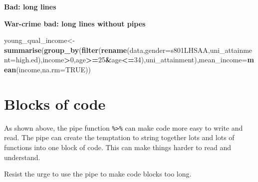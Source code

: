 \documentclass[]{book}
\newenvironment{Shaded}{\begin{snugshade}}{\end{snugshade}}
\newcommand{\DataTypeTok}[1]{\textcolor[rgb]{0.13,0.29,0.53}{#1}}
\newcommand{\DecValTok}[1]{\textcolor[rgb]{0.00,0.00,0.81}{#1}}
\newcommand{\KeywordTok}[1]{\textcolor[rgb]{0.13,0.29,0.53}{\textbf{#1}}}
\newcommand{\NormalTok}[1]{#1}
\newcommand{\OperatorTok}[1]{\textcolor[rgb]{0.81,0.36,0.00}{\textbf{#1}}}
\newcommand{\OtherTok}[1]{\textcolor[rgb]{0.56,0.35,0.01}{#1}}
\newcommand{\StringTok}[1]{\textcolor[rgb]{0.31,0.60,0.02}{#1}}
\begin{document}
\textbf{Bad: long lines}

\begin{Shaded}
\end{Shaded}

\textbf{War-crime bad: long lines without pipes}

\begin{Shaded}
\begin{Highlighting}[]
\NormalTok{young_qual_income<-}\KeywordTok{summarise}\NormalTok{(}\KeywordTok{group_by}\NormalTok{(}\KeywordTok{filter}\NormalTok{(}\KeywordTok{rename}\NormalTok{(data,}\DataTypeTok{gender=}\NormalTok{s801LHSAA,}\DataTypeTok{uni_attainment=}\NormalTok{high.ed),income}\OperatorTok{>}\DecValTok{0}\NormalTok{,age}\OperatorTok{>=}\DecValTok{25}\OperatorTok{&}\NormalTok{age}\OperatorTok{<=}\DecValTok{34}\NormalTok{),uni_attainment),}\DataTypeTok{mean_income=}\KeywordTok{mean}\NormalTok{(income,}\DataTypeTok{na.rm=}\OtherTok{TRUE}\NormalTok{))}
\end{Highlighting}
\end{Shaded}

\hypertarget{blocks-of-code}{%
\chapter{Blocks of code}\label{blocks-of-code}}

As shown above, the pipe function \texttt{\%\textgreater{}\%} can make code more easy to write and read. The pipe can create the temptation to string together lots and lots of functions into one block of code. This can make things harder to read and understand.

Resist the urge to use the pipe to make code blocks too long.
\end{document}
